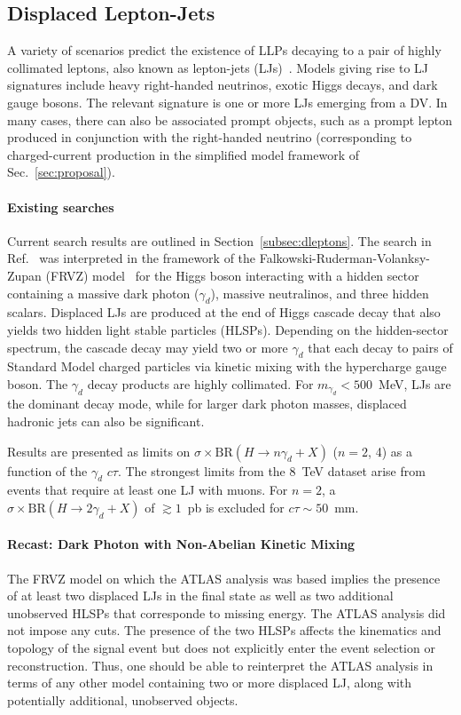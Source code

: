\subsection{Displaced Lepton-Jets}

A variety of scenarios predict the existence of LLPs decaying to a pair of highly collimated leptons, also known as lepton-jets (LJs)~\cite{ArkaniHamed:2008qp}. Models giving rise to LJ signatures include heavy right-handed neutrinos, exotic Higgs decays, and dark gauge bosons. The relevant signature is one or more LJs emerging from a DV. In many cases, there can also be associated prompt objects, such as a prompt lepton produced in conjunction with the right-handed neutrino (corresponding to charged-current production in the simplified model framework of Sec.~\ref{sec:proposal}).

\paragraph {Existing searches} Current search results are outlined in Section~\ref{subsec:dleptons}. The search in Ref.~\cite{ATLAS-CONF-2016-042} was interpreted in the framework of the Falkowski-Ruderman-Volanksy-Zupan (FRVZ) model~\cite{Falkowski:2010cm} for the Higgs boson interacting with a hidden sector containing a massive dark photon ($\gamma_d$), massive neutralinos, and three hidden scalars. Displaced LJs are produced at the end of Higgs cascade decay that also yields two hidden light stable particles (HLSPs). Depending on the hidden-sector spectrum, the cascade decay may yield two or more $\gamma_d$ that each decay to pairs of Standard Model charged particles via kinetic mixing with the hypercharge gauge boson. The $\gamma_d$ decay products are highly collimated. For $m_{\gamma_d} < 500$~MeV, LJs are the dominant decay mode, while for larger dark photon masses, displaced hadronic jets can also be significant.

Results are presented as limits on $\sigma\times \mathrm{BR}(H\to n\gamma_d+X)$ ($n=2$, 4) as a function of the $\gamma_d$ $c\tau$. The strongest limits from the 8~TeV dataset arise from events that require at least one LJ with muons. For $n=2$, a $\sigma\times \mathrm{BR}(H\to 2\gamma_d+X)$ of $\gtrsim1$~pb is excluded for $c\tau\sim 50$~mm.

\paragraph {Recast: Dark Photon with Non-Abelian Kinetic Mixing} The FRVZ model on which the ATLAS analysis was based implies the presence of at least two displaced LJs in the final state as well as two additional unobserved HLSPs that corresponde to missing energy. The ATLAS analysis did not impose any \MET cuts. The presence of the two HLSPs affects the kinematics and topology of the signal event but does not explicitly enter the event selection or reconstruction. Thus, one should be able to reinterpret the ATLAS analysis in terms of any other model containing two or more displaced LJ, along with potentially additional, unobserved objects.

